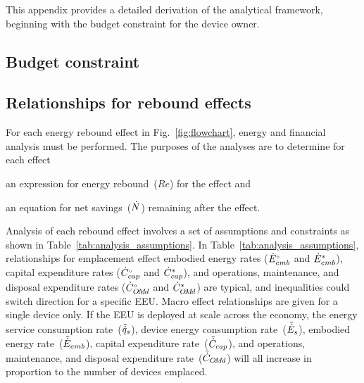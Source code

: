

This appendix provides a detailed derivation of 
the analytical framework,
beginning with the budget constraint for the device owner.


\subsection{Budget constraint}
\label{sec:budget_constraint}







\subsection{Relationships for rebound effects}
\label{sec:relationships_for_stages}

For each energy rebound effect in Fig.~\ref{fig:flowchart},
energy and financial analysis must be performed.
The purposes of the analyses are to determine for each effect
%
\begin{enumerate*}[label={(\roman*)}]

  \item an expression for energy rebound~($Re$) for the effect and

  \item an equation for net savings~($\dot{N}$) remaining after the effect.

\end{enumerate*}

Analysis of each rebound effect
involves a set of assumptions and constraints
as shown in Table~\ref{tab:analysis_assumptions}.
In Table~\ref{tab:analysis_assumptions},
relationships for emplacement effect
embodied energy rates (${}{\dot{E}}^{\scriptscriptstyle \circ}_{emb}$ and ${\dot{E}}^*_{emb}$),
capital expenditure rates (${}{\dot{C}}^{\scriptscriptstyle \circ}_{cap}$ and ${\dot{C}}^*_{cap}$), and
operations, maintenance, and disposal
expenditure rates (${}{\dot{C}}^{\scriptscriptstyle \circ}_{O\!M\!d}$ and ${\dot{C}}^*_{O\!M\!d}$)
are typical, and
inequalities could switch direction for a specific EEU.
Macro effect relationships are given for a single device only.
If the EEU is deployed at scale across the economy,
the energy service consumption rate~($\tilde{\dot{q}}_s$),
device energy consumption rate~($\tilde{\dot{E}}_s$),
embodied energy rate~($\tilde{\dot{E}}_{emb}$),
capital expenditure rate~($\tilde{\dot{C}}_{cap}$), and
operations, maintenance, and disposal expenditure rate~($\tilde{\dot{C}}_{O\!M\!d}$)
will all increase in proportion to the number of devices emplaced.

